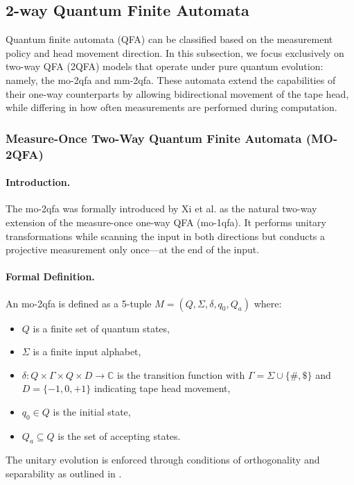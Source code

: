 \subsection{2-way Quantum Finite Automata}
\label{sec:2-way-qfa}

Quantum finite automata (QFA) can be classified based on the measurement policy and head movement direction. In this subsection, we focus exclusively on two-way QFA (2QFA) models that operate under pure quantum evolution: namely, the \gls{mo-2qfa} and \gls{mm-2qfa}. These automata extend the capabilities of their one-way counterparts by allowing bidirectional movement of the tape head, while differing in how often measurements are performed during computation.

\subsubsection{Measure-Once Two-Way Quantum Finite Automata (MO-2QFA)}

\paragraph{Introduction.} The \gls{mo-2qfa} was formally introduced by Xi et al. \cite{xi2008some} as the natural two-way extension of the measure-once one-way QFA (\gls{mo-1qfa}). It performs unitary transformations while scanning the input in both directions but conducts a projective measurement only once—at the end of the input.

\paragraph{Formal Definition.} An \gls{mo-2qfa} is defined as a 5-tuple $M = (Q, \Sigma, \delta, q_0, Q_a)$ where:
\begin{itemize}
    \item $Q$ is a finite set of quantum states,
    \item $\Sigma$ is a finite input alphabet,
    \item $\delta: Q \times \Gamma \times Q \times D \to \mathbb{C}$ is the transition function with $\Gamma = \Sigma \cup \{\#, \$\}$ and $D = \{-1, 0, +1\}$ indicating tape head movement,
    \item $q_0 \in Q$ is the initial state,
    \item $Q_a \subseteq Q$ is the set of accepting states.
\end{itemize}
The unitary evolution is enforced through conditions of orthogonality and separability as outlined in \cite{xi2008some}.

